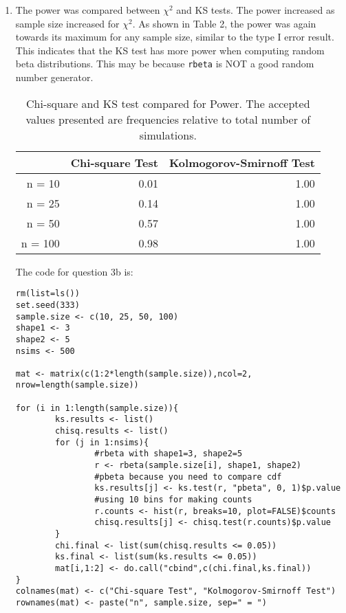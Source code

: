 \documentclass{article}
\begin{document}
\begin{enumerate}
\begin{enumerate}
\item The power was compared between ${\chi^2}$ and KS tests. The power increased as sample size increased for ${\chi^2}$. As shown in Table 2, the power was again towards its maximum for any sample size, similar to the type I error result. This indicates that the KS test has more power when computing random beta distributions. This may be because {\tt{rbeta}} is NOT a good random number generator. 

\begin{table}[ht]
\centering
\caption{Chi-square and KS test compared for Power. The accepted values presented are frequencies relative to total number of simulations.}
\begin{tabular}{rrr}
  \hline
 & Chi-square Test & Kolmogorov-Smirnoff Test \\ 
  \hline
n = 10 & 0.01 & 1.00 \\ 
  n = 25 & 0.14 & 1.00 \\ 
  n = 50 & 0.57 & 1.00 \\ 
  n = 100 & 0.98 & 1.00 \\ 
   \hline
\end{tabular}
\end{table}
The code for question 3b is:
\begin{verbatim}
rm(list=ls())
set.seed(333)
sample.size <- c(10, 25, 50, 100)
shape1 <- 3
shape2 <- 5
nsims <- 500

mat <- matrix(c(1:2*length(sample.size)),ncol=2, nrow=length(sample.size))

for (i in 1:length(sample.size)){
        ks.results <- list()
        chisq.results <- list()
        for (j in 1:nsims){
                #rbeta with shape1=3, shape2=5
                r <- rbeta(sample.size[i], shape1, shape2) 
                #pbeta because you need to compare cdf
                ks.results[j] <- ks.test(r, "pbeta", 0, 1)$p.value
                #using 10 bins for making counts
                r.counts <- hist(r, breaks=10, plot=FALSE)$counts 
                chisq.results[j] <- chisq.test(r.counts)$p.value
        }
        chi.final <- list(sum(chisq.results <= 0.05))
        ks.final <- list(sum(ks.results <= 0.05))
        mat[i,1:2] <- do.call("cbind",c(chi.final,ks.final))
}
colnames(mat) <- c("Chi-square Test", "Kolmogorov-Smirnoff Test")
rownames(mat) <- paste("n", sample.size, sep=" = ")
\end{verbatim}

\end{enumerate}


\end{enumerate}
\end{document}
